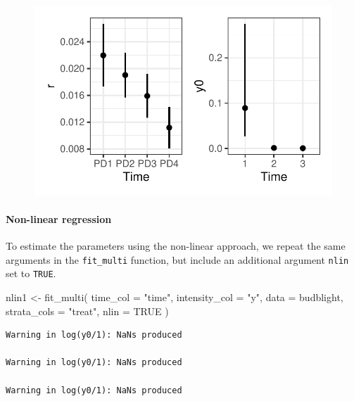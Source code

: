 \documentclass[
  letterpaper,
  DIV=11,
  numbers=noendperiod]{scrreprt}
\let\oldparagraph\paragraph
\renewcommand{\paragraph}[1]{\oldparagraph{#1}\mbox{}}
\newenvironment{Shaded}{\begin{snugshade}}{\end{snugshade}}
\newcommand{\AttributeTok}[1]{\textcolor[rgb]{0.40,0.45,0.13}{#1}}
\newcommand{\ConstantTok}[1]{\textcolor[rgb]{0.56,0.35,0.01}{#1}}
\newcommand{\FunctionTok}[1]{\textcolor[rgb]{0.28,0.35,0.67}{#1}}
\newcommand{\NormalTok}[1]{\textcolor[rgb]{0.00,0.23,0.31}{#1}}
\newcommand{\OtherTok}[1]{\textcolor[rgb]{0.00,0.23,0.31}{#1}}
\newcommand{\StringTok}[1]{\textcolor[rgb]{0.13,0.47,0.30}{#1}}
\begin{document}
\begin{figure}[H]

{\centering \includegraphics{./temporal-fitting_files/figure-pdf/unnamed-chunk-44-1.pdf}

}

\end{figure}

\hypertarget{non-linear-regression}{%
\paragraph{Non-linear regression}\label{non-linear-regression}}

To estimate the parameters using the non-linear approach, we repeat the
same arguments in the \texttt{fit\_multi} function, but include an
additional argument \texttt{nlin} set to \texttt{TRUE}.

\begin{Shaded}
\begin{Highlighting}[]
\NormalTok{nlin1 }\OtherTok{\textless{}{-}} \FunctionTok{fit\_multi}\NormalTok{(}
  \AttributeTok{time\_col =} \StringTok{"time"}\NormalTok{,}
  \AttributeTok{intensity\_col =} \StringTok{"y"}\NormalTok{,}
  \AttributeTok{data =}\NormalTok{ budblight,}
  \AttributeTok{strata\_cols =} \StringTok{"treat"}\NormalTok{,}
  \AttributeTok{nlin =} \ConstantTok{TRUE}
\NormalTok{)}
\end{Highlighting}
\end{Shaded}

\begin{verbatim}
Warning in log(y0/1): NaNs produced

Warning in log(y0/1): NaNs produced

Warning in log(y0/1): NaNs produced
\end{verbatim}
\end{document}
